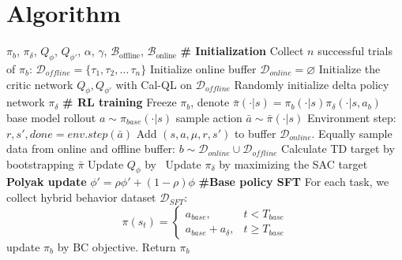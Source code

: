 \section{Algorithm}
\begin{algorithm}[] 
   \caption{\texttt{PLD} with base-policy initialization}
   \label{alg: pipeline}
\begin{algorithmic}
   \REQUIRE $\pi_b$, $\pi_\delta$, $Q_\phi$, $Q_{\phi '}$, $\alpha$, $\gamma$, $\mathcal{B}_\text{offline}$, $\mathcal{B}_\text{online}$
    \STATE \textbf{\# Initialization}
    \STATE Collect $n$ successful trials of $\pi_b$: $\mathcal{D}_{offline} = \{\tau_1, \tau_2, \dots\, \tau_n\}$
    \STATE Initialize online buffer $\mathcal{D}_{online} = \varnothing$
    \STATE Initialize the critic network $Q_\phi, Q_{\phi'}$ with Cal-QL on $\mathcal{D}_{offline}$
    \STATE Randomly initialize delta policy network $\pi_\delta$
    \STATE \textbf{\# RL training}
    \STATE Freeze $\pi_b$, denote $\bar\pi(\cdot|s) = \pi_b(\cdot|s)\pi_\delta(\cdot | s, a_b)$
                \STATE base model rollout $ a \sim \pi_{base}(\cdot | s)$
            \ELSE
                \STATE sample action $\bar{a} \sim \bar\pi(\cdot | s)$
            \ENDIF
            \STATE Environment step: $r, s', done = env.step(\bar{a})$
            \STATE Add $(s, a, \mu, r, s')$ to buffer $\mathcal{D}_{online}$.
        \ENDIF
        \STATE Equally sample data from online and offline buffer: $b \sim \mathcal{D}_{online} \cup \mathcal{D}_{offline}$
        \STATE Calculate TD target by bootstrapping $\bar{\pi}$
        \STATE Update $Q_\phi$ by~
        \STATE Update $\pi_{\delta}$ by maximizing the SAC target
        \STATE \textbf{Polyak update} $\phi'=\rho\phi' + (1-\rho)\phi$
    \ENDFOR
    \STATE \textbf{\#Base policy SFT}
    \STATE For each task, we collect hybrid behavior dataset $\mathcal{D}_{SFT}$: \[
                \pi(s_t) =
                \begin{cases} 
                a_{base}, & t < T_{base} \\ 
                a_{base} + a_{\delta} , & t \geq T_{base}
                \end{cases}
                \]
        \STATE update $\pi_b$ by BC objective.
    \ENDFOR
    \STATE Return $\pi_b$
\end{algorithmic}
\end{algorithm}



